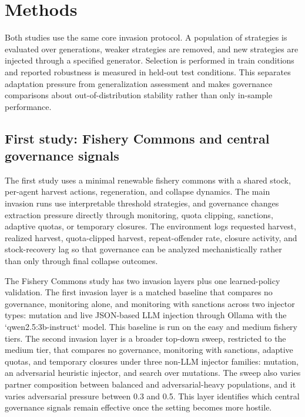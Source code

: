 \section{Methods}

Both studies use the same core invasion protocol. A population of strategies is evaluated over generations, weaker strategies are removed, and new strategies are injected through a specified generator. Selection is performed in train conditions and reported robustness is measured in held-out test conditions. This separates adaptation pressure from generalization assessment and makes governance comparisons about out-of-distribution stability rather than only in-sample performance.

\subsection{First study: Fishery Commons and central governance signals}

The first study uses a minimal renewable fishery commons with a shared stock, per-agent harvest actions, regeneration, and collapse dynamics. The main invasion runs use interpretable threshold strategies, and governance changes extraction pressure directly through monitoring, quota clipping, sanctions, adaptive quotas, or temporary closures. The environment logs requested harvest, realized harvest, quota-clipped harvest, repeat-offender rate, closure activity, and stock-recovery lag so that governance can be analyzed mechanistically rather than only through final collapse outcomes.

The Fishery Commons study has two invasion layers plus one learned-policy validation. The first invasion layer is a matched baseline that compares no governance, monitoring alone, and monitoring with sanctions across two injector types: mutation and live JSON-based LLM injection through Ollama with the `qwen2.5:3b-instruct` model. This baseline is run on the easy and medium fishery tiers. The second invasion layer is a broader top-down sweep, restricted to the medium tier, that compares no governance, monitoring with sanctions, adaptive quotas, and temporary closures under three non-LLM injector families: mutation, an adversarial heuristic injector, and search over mutations. The sweep also varies partner composition between balanced and adversarial-heavy populations, and it varies adversarial pressure between 0.3 and 0.5. This layer identifies which central governance signals remain effective once the setting becomes more hostile.


